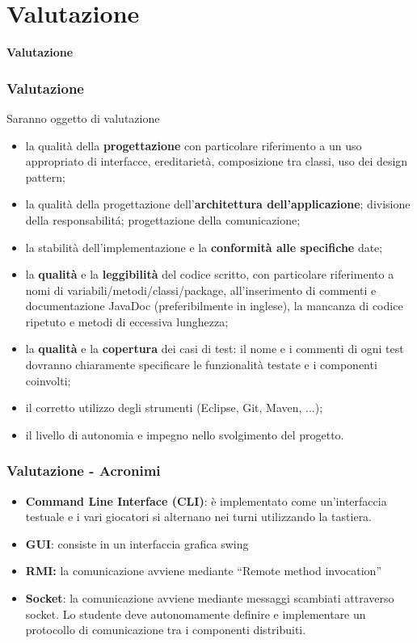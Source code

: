 \documentclass{beamer}
\begin{document}
\section{Valutazione}

\begin{frame}
\LARGE	
\textbf{Valutazione}

\end{frame}

\begin{frame}
\frametitle{Valutazione}
Saranno oggetto di valutazione
\begin{itemize}
\item la qualit\` a della \textbf{progettazione} con particolare riferimento a
  un uso appropriato di interfacce, ereditariet\`a, composizione tra
  classi, uso dei design pattern;
\item la qualit\` a della progettazione dell'\textbf{architettura
  dell'applicazione}; divisione della responsabilit\'a; progettazione
  della comunicazione;
\item la stabilit\` a dell'implementazione e la \textbf{conformit\` a alle
  specifiche} date; 
\item la \textbf{qualit\` a} e la \textbf{leggibilit\` a} del codice scritto, con
  particolare riferimento a nomi di variabili/metodi/classi/package,
  all'inserimento di commenti e documentazione JavaDoc
  (preferibilmente in inglese), la mancanza di codice ripetuto e
  metodi di eccessiva lunghezza;
\item la \textbf{qualit\` a} e la \textbf{copertura} dei casi di test: il nome e i
  commenti di ogni test dovranno chiaramente specificare le funzionalit\`
  a testate e i componenti coinvolti;
 \item il corretto utilizzo degli strumenti (Eclipse, Git, Maven, ...);
\item il livello di autonomia e impegno nello svolgimento del progetto.
\end{itemize}
\end{frame}



\begin{frame}
\frametitle{Valutazione - Acronimi}
\begin{itemize}
\item \textbf{Command Line Interface (CLI)}: \`e implementato come un'interfaccia testuale e i vari giocatori si alternano nei turni utilizzando la tastiera.
\item \textbf{GUI}: consiste in un interfaccia grafica swing
\item \textbf{RMI:} la comunicazione avviene mediante ``Remote method invocation''
\item \textbf{Socket}: la comunicazione avviene mediante messaggi scambiati
  attraverso socket. Lo studente deve autonomamente definire e
  implementare un protocollo di comunicazione tra i componenti distribuiti.
\end{itemize}
\end{frame}
\end{document}
